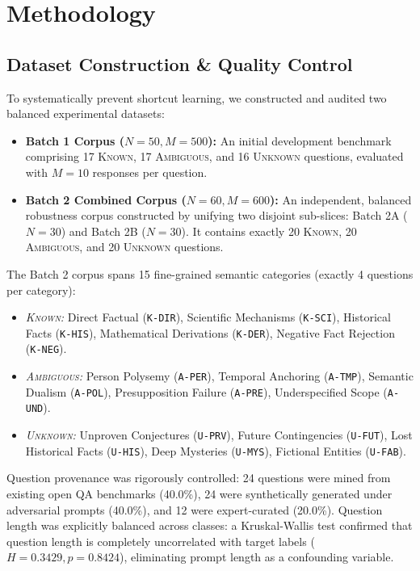 \documentclass[conference]{IEEEtran}
\begin{document}
\section{Methodology}

\subsection{Dataset Construction \& Quality Control}
To systematically prevent shortcut learning, we constructed and audited two balanced experimental datasets:
\begin{itemize}
    \item \textbf{Batch 1 Corpus ($N=50, M=500$):} An initial development benchmark comprising 17 \textsc{Known}, 17 \textsc{Ambiguous}, and 16 \textsc{Unknown} questions, evaluated with $M=10$ responses per question.
    \item \textbf{Batch 2 Combined Corpus ($N=60, M=600$):} An independent, balanced robustness corpus constructed by unifying two disjoint sub-slices: Batch 2A ($N=30$) and Batch 2B ($N=30$). It contains exactly 20 \textsc{Known}, 20 \textsc{Ambiguous}, and 20 \textsc{Unknown} questions.
\end{itemize}

The Batch 2 corpus spans 15 fine-grained semantic categories (exactly 4 questions per category):
\begin{itemize}
    \item \textit{\textsc{Known}:} Direct Factual (\texttt{K-DIR}), Scientific Mechanisms (\texttt{K-SCI}), Historical Facts (\texttt{K-HIS}), Mathematical Derivations (\texttt{K-DER}), Negative Fact Rejection (\texttt{K-NEG}).
    \item \textit{\textsc{Ambiguous}:} Person Polysemy (\texttt{A-PER}), Temporal Anchoring (\texttt{A-TMP}), Semantic Dualism (\texttt{A-POL}), Presupposition Failure (\texttt{A-PRE}), Underspecified Scope (\texttt{A-UND}).
    \item \textit{\textsc{Unknown}:} Unproven Conjectures (\texttt{U-PRV}), Future Contingencies (\texttt{U-FUT}), Lost Historical Facts (\texttt{U-HIS}), Deep Mysteries (\texttt{U-MYS}), Fictional Entities (\texttt{U-FAB}).
\end{itemize}

Question provenance was rigorously controlled: 24 questions were mined from existing open QA benchmarks (40.0\%), 24 were synthetically generated under adversarial prompts (40.0\%), and 12 were expert-curated (20.0\%). Question length was explicitly balanced across classes: a Kruskal-Wallis test confirmed that question length is completely uncorrelated with target labels ($H = 0.3429, p = 0.8424$), eliminating prompt length as a confounding variable.
\end{document}
